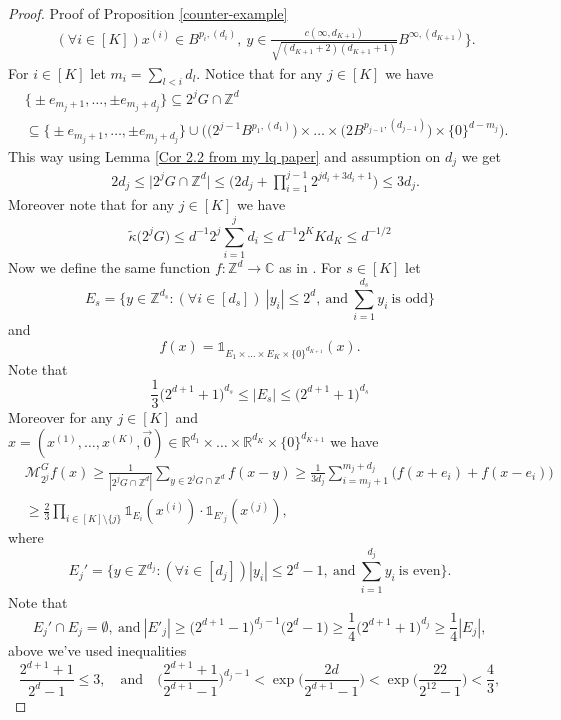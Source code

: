 \documentclass[a4paper,oneside, reqno]{amsart}
\numberwithin{equation}{section}
\theoremstyle{definition}%
\theoremstyle{definition}
\theoremstyle{definition}%
\theoremstyle{definition}
\newcommand{\Z}{\mathbb{Z}}
\newcommand{\R}{\mathbb{R}}
\newcommand{\C}{\mathbb{C}}
\begin{document}
\begin{proof}{Proof of Proposition \ref{counter-example}}
\begin{align*}
    & (\forall i \in [K]) x^{(i)} \in B^{p_i,(d_i)}, \ y \in  \frac{c( \infty, d_{K+1})}{\sqrt{(d_{K+1}+2)(d_{K+1}+1)}} B^{\infty,(d_{K+1})} \Big\}.
\end{align*}
For $i \in [K]$ let $m_i= \sum_{l<i} d_l$. Notice that for any $j \in [K]$ we have 
\begin{align*}
    &\Big\{\pm e_{m_j+1}, \ldots, \pm e_{m_j+d_j} \Big\} \subseteq  2^jG \cap \Z^d \\
    &\subseteq  \Big\{\pm e_{m_j+1}, \ldots, \pm e_{m_j+d_j} \Big\} \cup \bigg(\Big( 2^{j-1} B^{p_1,(d_1)} \Big) \times \ldots \times \Big( 2B^{p_{j-1},(d_{j-1})}\Big) \times \{ 0 \}^{d-m_j} \bigg).
\end{align*}
This way using Lemma \ref{Cor 2.2 from my lq paper} and assumption on $d_j$ we get
\begin{align*}
    & 2d_j \le \Big|2^j G \cap \Z^d \Big| \le \Big(2d_j+ \prod_{i=1}^{j-1} 2^{j d_i+3d_i+1} \Big) \le 3d_j.
\end{align*}
Moreover note that for any $j \in [K]$ we have
\[
\widetilde{\kappa}\Big(2^j G\Big) \le d^{-1} 2^j \sum_{i=1}^j d_i \le d^{-1} 2^K K d_K \le d^{-1/2}
\]
Now we define the same function $f: \Z^d \to \C$ as in \cite[Proof of Theorem 2]{cubes}. 
For $s \in [K]$ let 
\[
E_s= \Big\{y \in \Z^{d_s}: (\forall i \in [d_s])\  |y_i| \le 2^d, \ \text{and} \ \sum_{i=1}^{d_s} y_i \ \text{is odd} \Big\}
\]
and 
\[
f(x)= \mathds{1}_{E_1 \times \ldots \times E_K \times \{0\}^{d_{K+1}}}(x).
\]
Note that 
\[
\frac{1}{3} \Big(2^{d+1}+1\Big)^{d_s} \le |E_s| \le \Big(2^{d+1}+1\Big)^{d_s}
\]
Moreover for any $j \in [K]$ and $x=(x^{(1)}, \ldots, x^{(K)}, \overrightarrow{0}) \in \R^{d_1} \times \ldots \times \R^{d_K} \times \{0\}^{d_{K+1}}$ we have 
\begin{align*}
    &\mathcal{M}_{2^j}^Gf(x) \ge \frac{1}{|2^j G \cap \Z^d|} \sum_{y \in 2^jG \cap \Z^d} f(x-y) \ge  \frac{1}{3 d_j} \sum_{i=m_j+1}^{m_j+d_j} \big(f(x + e_i)+ f(x-e_i)\big) \\
    & \ge \frac{2}{3} \prod_{i \in [K] \setminus \{j\}} \mathds{1}_{E_i}(x^{(i)}) \cdot \mathds{1}_{E'_j}(x^{(j)}),
\end{align*}
where 
\[
E_j'= \Big\{y \in \Z^{d_j}: (\forall i \in [d_j]) |y_i| \le 2^{d}-1, \ \text{and} \ \sum_{i=1}^{d_j} y_i \ \text{is even} \Big\}.
\]
Note that 
\[
E_j' \cap E_j= \emptyset, \ \text{and} \ |E'_j| \ge \Big(2^{d+1}-1\Big)^{d_j-1} \Big(2^d-1 \Big) \ge \frac{1}{4} \Big(2^{d+1}+1\Big)^{d_j} \ge \frac{1}{4} |E_j|,
\]
above we've used inequalities 
\[
 \frac{2^{d+1}+1}{2^d-1} \le 3, \quad \text{and} \quad \Big(\frac{2^{d+1}+1}{2^{d+1}-1} \Big)^{d_j-1} < \exp \Big( \frac{2d}{2^{d+1}-1} \Big) < \exp \Big( \frac{22}{2^{12}-1}\Big)< \frac{4}{3},
\]
\end{proof}
\end{document}
